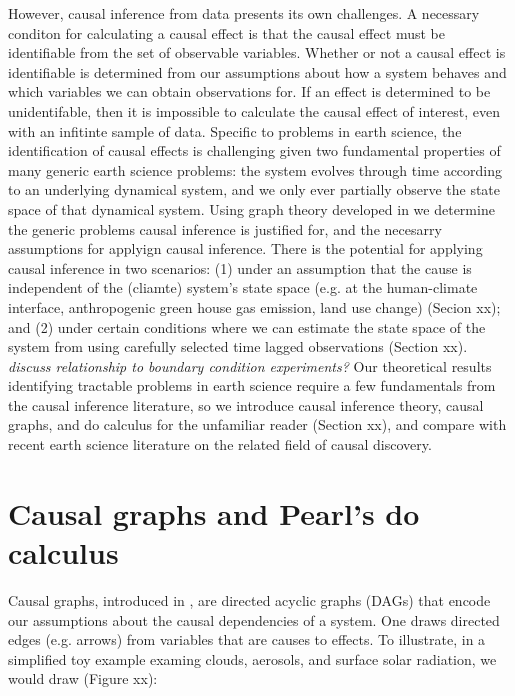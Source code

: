 \documentclass[12pt]{article}
\begin{document}
However, causal inference from data presents its own challenges. A
necessary conditon for calculating a causal effect is that the
causal effect must be identifiable from the set of observable
variables. Whether or not a causal effect is identifiable is
determined from our assumptions about how a system behaves and
which variables we can obtain observations for. If an effect is
determined to be unidentifable, then it is impossible to calculate
the causal effect of interest, even with an infitinte sample of
data. Specific to problems in earth science, the identification of
causal effects is challenging given two fundamental properties of
many generic earth science problems: the system evolves through
time according to an underlying dynamical system, and we only ever
partially observe the state space of that dynamical system. Using
graph theory developed in \citep{pearl1995causal} we determine the
generic problems causal inference is justified for, and the
necesarry assumptions for applyign causal inference. There is the
potential for applying causal inference in two scenarios: (1)
under an assumption that the cause is independent of the (cliamte)
system's state space (e.g. at the human-climate interface,
anthropogenic green house gas emission, land use change) (Secion
xx); and (2) under certain conditions where we can estimate the
state space of the system from using carefully selected time
lagged observations (Section xx).  \emph{discuss relationship to
boundary condition experiments?} Our theoretical results
identifying tractable problems in earth science require a few
fundamentals from the causal inference literature, so we introduce
causal inference theory, causal graphs, and do calculus for the
unfamiliar reader (Section xx), and compare with recent earth
science literature on the related field of causal discovery.


\section{Causal graphs and Pearl's do calculus}


Causal graphs, introduced in \citep{pearl1995causal}, are directed
acyclic graphs (DAGs) that encode our assumptions about the causal
dependencies of a system. One draws directed edges (e.g. arrows)
from variables that are causes to effects. To illustrate, in a
simplified toy example examing clouds, aerosols, and surface solar
radiation, we would draw (Figure xx):
\end{document}
